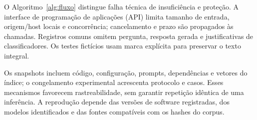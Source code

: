 O Algoritmo~\ref{alg:fluxo} distingue falha técnica de insuficiência e proteção. A interface de programação de aplicações (API) limita tamanho de entrada, origem/host locais e concorrência; cancelamento e prazo são propagados às chamadas. Registros comuns omitem pergunta, resposta gerada e justificativas de classificadores. Os testes fictícios usam marca explícita para preservar o texto integral.

Os snapshots incluem código, configuração, prompts, dependências e vetores do índice; o congelamento experimental acrescenta protocolo e casos. Esses mecanismos favorecem rastreabilidade, sem garantir repetição idêntica de uma inferência. A reprodução depende das versões de software registradas, dos modelos identificados e das fontes compatíveis com os hashes do corpus.
